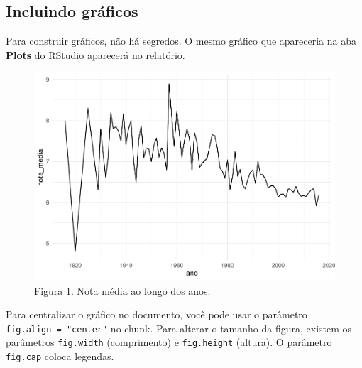 \documentclass[
]{article}
\begin{document}
\hypertarget{incluindo-gruxe1ficos}{%
\subsection{Incluindo gráficos}\label{incluindo-gruxe1ficos}}

Para construir gráficos, não há segredos. O mesmo gráfico que apareceria
na aba \textbf{Plots} do RStudio aparecerá no relatório.

\begin{figure}

{\centering \includegraphics{01-intro-rmarkdown_files/figure-latex/unnamed-chunk-9-1} 

}

\caption{Figura 1. Nota média ao longo dos anos.}\label{fig:unnamed-chunk-9}
\end{figure}

Para centralizar o gráfico no documento, você pode usar o parâmetro
\texttt{fig.align\ =\ "center"} no chunk. Para alterar o tamanho da
figura, existem os parâmetros \texttt{fig.width} (comprimento) e
\texttt{fig.height} (altura). O parâmetro \texttt{fig.cap} coloca
legendas.
\end{document}
